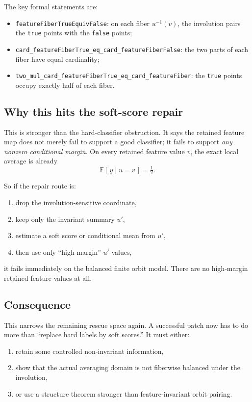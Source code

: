 \documentclass[11pt]{article}
\theoremstyle{remark}
\begin{document}
\noindent
The key formal statements are:
\begin{itemize}[leftmargin=1.5em]
  \item \texttt{featureFiberTrueEquivFalse}: on each fiber \(u^{-1}(v)\), the involution pairs
  the \texttt{true} points with the \texttt{false} points;
  \item \texttt{card\_featureFiberTrue\_eq\_card\_featureFiberFalse}: the two parts of each fiber
  have equal cardinality;
  \item \texttt{two\_mul\_card\_featureFiberTrue\_eq\_card\_featureFiber}: the \texttt{true}
  points occupy exactly half of each fiber.
\end{itemize}

\subsection{Why this hits the soft-score repair}

This is stronger than the hard-classifier obstruction.  It says the retained feature map does not
merely fail to support a good classifier; it fails to support \emph{any nonzero conditional
margin}.  On every retained feature value \(v\), the exact local average is already
\[
  \mathbb{E}[\,y \mid u=v\,] = \tfrac12.
\]

So if the repair route is:
\begin{enumerate}[leftmargin=1.5em]
  \item drop the involution-sensitive coordinate,
  \item keep only the invariant summary \(u'\),
  \item estimate a soft score or conditional mean from \(u'\),
  \item then use only ``high-margin'' \(u'\)-values,
\end{enumerate}
it fails immediately on the balanced finite orbit model.  There are no high-margin retained
feature values at all.

\subsection{Consequence}

This narrows the remaining rescue space again.  A successful patch now has to do more than
``replace hard labels by soft scores.''  It must either:
\begin{enumerate}[leftmargin=1.5em]
  \item retain some controlled non-invariant information,
  \item show that the actual averaging domain is not fiberwise balanced under the involution,
  \item or use a structure theorem stronger than feature-invariant orbit pairing.
\end{enumerate}
\end{document}
